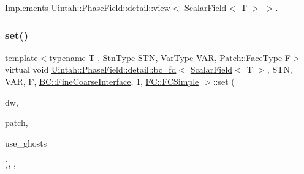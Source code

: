 Implements \hyperlink{classUintah_1_1PhaseField_1_1detail_1_1view_3_01ScalarField_3_01T_01_4_01_4_aea43cfedfe3b6f3c038ff795caec49b8}{Uintah\+::\+Phase\+Field\+::detail\+::view$<$ Scalar\+Field$<$ T $>$ $>$}.

\mbox{\label{classUintah_1_1PhaseField_1_1detail_1_1bc__fd_3_01ScalarField_3_01T_01_4_00_01STN_00_01VAR_00_01ce55d0bf8381798bc129da931b626e80_ac70a40f99b59aafe8dc8166ccd48347f}} 
\subsubsection{\texorpdfstring{set()}{set()}\hspace{0.1cm}{\footnotesize\ttfamily [1/2]}}
{\footnotesize\ttfamily template$<$typename T , Stn\+Type S\+TN, Var\+Type V\+AR, Patch\+::\+Face\+Type F$>$ \\
virtual void \hyperlink{classUintah_1_1PhaseField_1_1detail_1_1bc__fd}{Uintah\+::\+Phase\+Field\+::detail\+::bc\+\_\+fd}$<$ \hyperlink{structUintah_1_1PhaseField_1_1ScalarField}{Scalar\+Field}$<$ T $>$, S\+TN, V\+AR, F, \hyperlink{namespaceUintah_1_1PhaseField_a148fba372aa3be96fd6eede7a2fa10b5ad2d89be9637ff8b537fa4b6026c0e574}{B\+C\+::\+Fine\+Coarse\+Interface}, 1, \hyperlink{namespaceUintah_1_1PhaseField_aeb51fe956fe07f1487f5878f4039f27ca6a316dd1139b99e2a8af86106b3cf045}{F\+C\+::\+F\+C\+Simple} $>$\+::set (\begin{DoxyParamCaption}\item[{Data\+Warehouse $\ast$}]{dw,  }\item[{const Patch $\ast$}]{patch,  }\item[{bool}]{use\+\_\+ghosts }\end{DoxyParamCaption})\hspace{0.3cm}{\ttfamily [inline]}, {\ttfamily [override]}, {\ttfamily [virtual]}}



